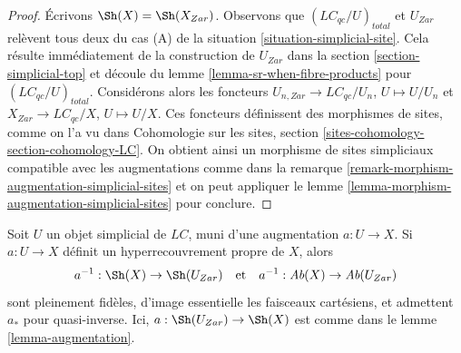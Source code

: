 \begin{proof}
Écrivons $\Sh(X) = \Sh(X_{Zar})$. Observons que
$(\textit{LC}_{qc}/U)_{total}$ et $U_{Zar}$ relèvent tous deux
du cas (A) de la situation \ref{situation-simplicial-site}.
Cela résulte immédiatement de la construction de
$U_{Zar}$ dans la section \ref{section-simplicial-top}
et découle du lemme \ref{lemma-sr-when-fibre-products}
pour $(\textit{LC}_{qc}/U)_{total}$.
Considérons alors les foncteurs
$U_{n, Zar} \to \textit{LC}_{qc}/U_n$, $U \mapsto U/U_n$
et
$X_{Zar} \to \textit{LC}_{qc}/X$, $U \mapsto U/X$.
Ces foncteurs définissent des morphismes de sites, comme on l'a vu
dans Cohomologie sur les sites, section \ref{sites-cohomology-section-cohomology-LC}.
On obtient ainsi un morphisme de sites simpliciaux compatible avec les augmentations
comme dans la remarque \ref{remark-morphism-augmentation-simplicial-sites}
et on peut appliquer le lemme
\ref{lemma-morphism-augmentation-simplicial-sites} pour conclure.
\end{proof}

\begin{lemma}
\label{lemma-descent-sheaves-for-proper-hypercovering}
Soit $U$ un objet simplicial de $\textit{LC}$, muni d'une augmentation $a : U \to X$.
Si $a : U \to X$ définit un hyperrecouvrement propre de $X$,
alors
$$
a^{-1} : \Sh(X) \to \Sh(U_{Zar})
\quad\text{et}\quad
a^{-1} : \textit{Ab}(X) \to \textit{Ab}(U_{Zar})
$$
sont pleinement fidèles, d'image essentielle les faisceaux cartésiens, et
admettent $a_*$ pour quasi-inverse. Ici, $a : \Sh(U_{Zar}) \to \Sh(X)$ est comme dans le lemme
\ref{lemma-augmentation}.
\end{lemma}

